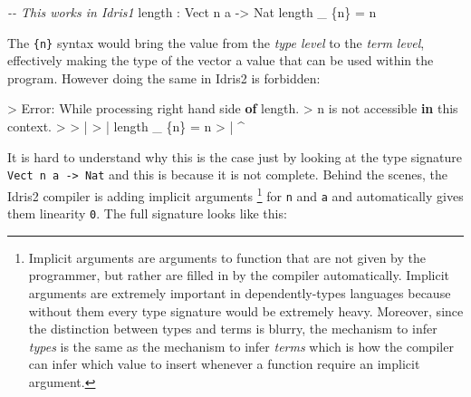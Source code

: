 \documentclass[
]{article}
\newenvironment{Shaded}{}{}
\newcommand{\CommentTok}[1]{\textcolor[rgb]{0.38,0.63,0.69}{\textit{#1}}}
\newcommand{\DataTypeTok}[1]{\textcolor[rgb]{0.56,0.13,0.00}{#1}}
\newcommand{\FunctionTok}[1]{\textcolor[rgb]{0.02,0.16,0.49}{#1}}
\newcommand{\KeywordTok}[1]{\textcolor[rgb]{0.00,0.44,0.13}{\textbf{#1}}}
\newcommand{\NormalTok}[1]{#1}
\newcommand{\OperatorTok}[1]{\textcolor[rgb]{0.40,0.40,0.40}{#1}}
\newcommand{\OtherTok}[1]{\textcolor[rgb]{0.00,0.44,0.13}{#1}}
\begin{document}
\begin{Shaded}
\begin{Highlighting}[]
\CommentTok{{-}{-} This works in Idris1}
\FunctionTok{length} \OperatorTok{:} \DataTypeTok{Vect}\NormalTok{ n a }\OtherTok{{-}\textgreater{}} \DataTypeTok{Nat}
\FunctionTok{length}\NormalTok{ \_ \{n\} }\OtherTok{=}\NormalTok{ n}
\end{Highlighting}
\end{Shaded}

The \texttt{\{n\}} syntax would bring the value from the \emph{type
level} to the \emph{term level}, effectively making the type of the
vector a value that can be used within the program. However doing the
same in Idris2 is forbidden:

\begin{Shaded}
\begin{Highlighting}[]
\OperatorTok{\textgreater{}} \DataTypeTok{Error}\OperatorTok{:} \DataTypeTok{While}\NormalTok{ processing right hand side }\KeywordTok{of} \FunctionTok{length}\OperatorTok{.} 
\OperatorTok{\textgreater{}}\NormalTok{   n is }\FunctionTok{not}\NormalTok{ accessible }\KeywordTok{in}\NormalTok{ this context}\OperatorTok{.}
\OperatorTok{\textgreater{}} 
\OperatorTok{\textgreater{}}     \OperatorTok{|}
\OperatorTok{\textgreater{}}     \OperatorTok{|} \FunctionTok{length}\NormalTok{ \_ \{n\} }\OtherTok{=}\NormalTok{ n}
\OperatorTok{\textgreater{}}     \OperatorTok{|}                \OperatorTok{\^{}}
\end{Highlighting}
\end{Shaded}

It is hard to understand why this is the case just by looking at the
type signature \texttt{Vect\ n\ a\ -\textgreater{}\ Nat} and this is
because it is not complete. Behind the scenes, the Idris2 compiler is
adding implicit arguments \footnote{Implicit arguments are arguments to
  function that are not given by the programmer, but rather are filled
  in by the compiler automatically. Implicit arguments are extremely
  important in dependently-types languages because without them every
  type signature would be extremely heavy. Moreover, since the
  distinction between types and terms is blurry, the mechanism to infer
  \emph{types} is the same as the mechanism to infer \emph{terms} which
  is how the compiler can infer which value to insert whenever a
  function require an implicit argument.} for \texttt{n} and \texttt{a}
and automatically gives them linearity \texttt{0}. The full signature
looks like this:
\end{document}
